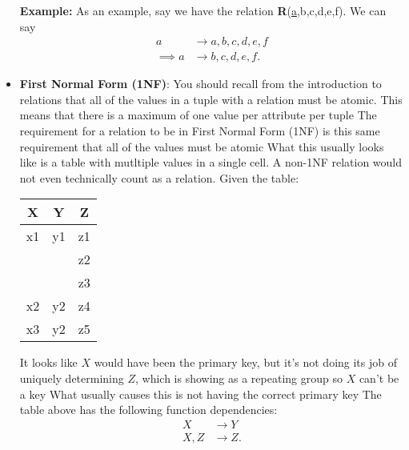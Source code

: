 \documentclass{report}
\begin{document}
\begin{itemize}
            \bigbreak \noindent 
            \textbf{Example:} As an example, say we have the relation \textbf{R}(\underline{a},b,c,d,e,f). We can say
            \begin{align*}
                a &\to a,b,c,d,e,f \\
                \implies a&\to b,c,d,e,f
            .\end{align*}
        \item \textbf{First Normal Form (1NF)}: You should recall from the introduction to relations that all of the values in a tuple with a relation must be atomic. This means that there is a maximum of one value per attribute per tuple
            \bigbreak \noindent 
            The requirement for a relation to be in First Normal Form (1NF) is this same requirement that all of the values must be atomic
            \bigbreak \noindent 
            What this usually looks like is a table with mutltiple values in a single cell. A non-1NF relation would not even technically count as a relation.
            \bigbreak \noindent 
            Given the table:
            \bigbreak \noindent 
            \begin{center}
                \begin{tabular}{|c|c|c|}
                    \hline
                    X  & Y  & Z  \\ \hline
                    x1 & y1 & z1 \\ 
                       &    & z2 \\ 
                       &    & z3 \\ \hline
                    x2 & y2 & z4 \\ \hline
                    x3 & y2 & z5 \\ \hline
                \end{tabular}
            \end{center}
            \bigbreak \noindent 
            It looks like $X$ would have been the primary key, but it’s not doing its job of uniquely determining $Z$, which is showing as a repeating group so $X$ can’t be a key
            \bigbreak \noindent 
            What usually causes this is not having the correct primary key
            \bigbreak \noindent 
            The table above has the following function dependencies:
            \begin{align*}
                X &\to Y \\
               X,Z &\to Z
            .\end{align*}
            \bigbreak \noindent 

\end{itemize}
\end{document}
